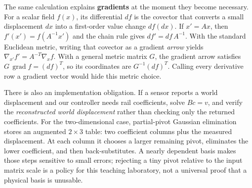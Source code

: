 The same calculation explains \textbf{gradients} at the moment they become necessary. For a scalar field \(f(x)\), its differential \(df\) is the covector that converts a small displacement \(dx\) into a first-order value change \(df(dx)\). If \(x'=Ax\), then \(f'(x')=f(A^{-1}x')\) and the chain rule gives \(df'=df\,A^{-1}\). With the standard Euclidean metric, writing that covector as a gradient \emph{arrow} yields \(\nabla_{x'}f'=A^{-T}\nabla_x f\). With a general metric matrix \(G\), the gradient arrow satisfies \(G\,\operatorname{grad}f=(df)^T\), so its coordinates are \(G^{-1}(df)^T\). Calling every derivative row a gradient vector would hide this metric choice.

There is also an implementation obligation. If a sensor reports a world displacement and our controller needs rail coefficients, solve \(Bc=v\), and verify the \emph{reconstructed world displacement} rather than checking only the returned coefficients. For the two-dimensional case, partial-pivot Gaussian elimination stores an augmented \(2\times3\) table: two coefficient columns plus the measured displacement. At each column it chooses a larger remaining pivot, eliminates the lower coefficient, and then back-substitutes. A nearly dependent basis makes those steps sensitive to small errors; rejecting a tiny pivot relative to the input matrix scale is a policy for this teaching laboratory, not a universal proof that a physical basis is unusable.

